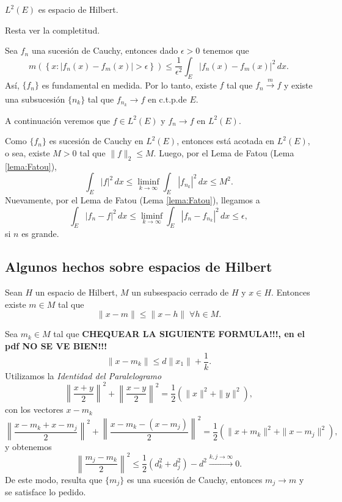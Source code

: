 \begin{teorema}{}
$L^2(E)$ es espacio de Hilbert.
\end{teorema}

\begin{demo}{}
Resta ver la completitud. 

Sea $f_n$ una sucesi\'on de Cauchy, entonces 
dado $\epsilon>0$ tenemos que 
\[
m\left(\left\{x: |f_n(x)-f_m(x)|>\epsilon \right\} \right)
\leq \frac{1}{\epsilon^2} \int_E |f_n(x)-f_m(x)|^2\,dx.
\]
As\'i, $\{f_n\}$ es fundamental en medida. Por lo tanto, 
existe $f$ tal que $f_n \xrightarrow[]{m} f$ y 
existe una subsucesi\'on $\{n_k\}$ tal que $f_{n_k}\to f$ en c.t.p.de $E$.

A continuaci\'on veremos  que $f \in L^2(E)$ y $f_n \to f$ en $L^2(E)$.

Como $\{f_n\}$ es sucesi\'on de Cauchy en $L^2(E)$, entonces est\'a acotada en $L^2(E)$, o sea, existe $M>0$ tal que $\|f\|_2\leq M$. 
Luego, por el Lema de Fatou (Lema \ref{lema:Fatou}), 
\[
\int_E |f|^2\,dx\leq \liminf\limits_{k \to \infty} \int_E |f_{n_k}|^2\,dx \leq M^2.
\]
Nuevamente, por el Lema de Fatou (Lema \ref{lema:Fatou}), llegamos a 
\[
\int_E |f_n-f|^2\,dx\leq \liminf\limits_{k \to \infty} \int_E |f_n-f_{n_k}|^2\,dx \leq \epsilon,
\]
si $n$ es grande.
\end{demo}

\subsection{Algunos hechos sobre espacios de Hilbert}

\begin{teorema}{}\label{teo:existe-proyeccion-sobre-H}
Sean $H$ un espacio de Hilbert,  $M$ un subsespacio cerrado de $H$ y  $x \in H$. Entonces existe $m \in M$ tal que 
\[
\|x-m\| \leq \|x-h\|\; \forall h \in M.
\]
\end{teorema}

\begin{demo}
Sea $m_k \in M$ tal que   \textbf{CHEQUEAR LA SIGUIENTE FORMULA!!!, en el pdf NO SE VE BIEN!!!}
\[ \|x-m_k\| \leq  d\|x_1\|+\frac{1}{k}. \]
Utilizamos la \emph{Identidad del Paralelogramo}
\[ 
\left\| \frac{x+y}{2} \right\|^2 +\left\| \frac{x-y}{2} \right\|^2
= \frac{1}{2}\left(\| x \|^2+ \|y\|^2  \right), 
\]
con los vectores $x-m_k$
\[ 
\left\| \frac{x-m_k+x-m_j}{2} \right\|^2 +\left\| \frac{x-m_k-(x-m_j)}{2} \right\|^2
= \frac{1}{2}\left(\| x+m_k \|^2+ \|x-m_j\|^2  \right), 
\]
y obtenemos
\[
\left\| \frac{m_j-m_k}{2} \right\|^2 \leq \frac{1}{2} \left(d_k^2 +d_j^2\right)-d^2
\xrightarrow[]{k,j \to \infty}0.
\]
De este modo, resulta que $\{m_j\}$ es una sucesi\'on de Cauchy, entonces $m_j \to m$ 
y se satisface lo pedido.
\end{demo}

